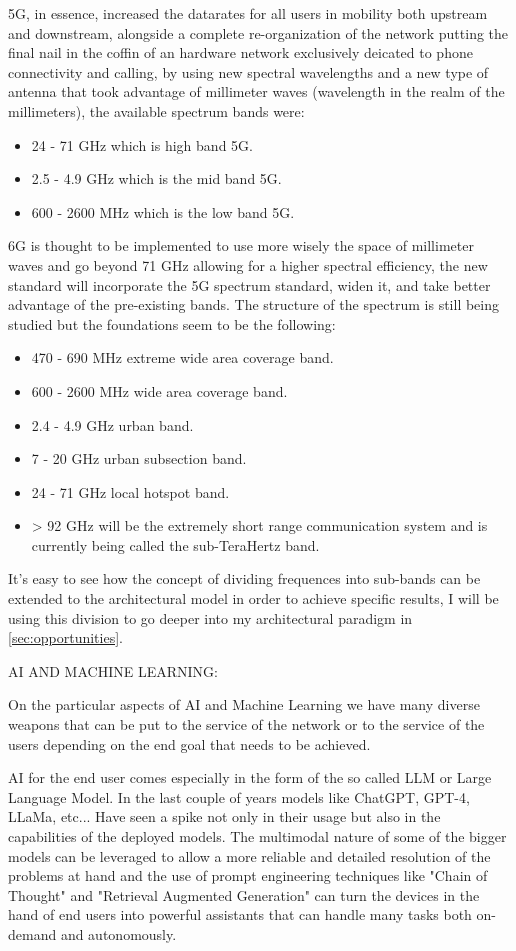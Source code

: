 5G, in essence, increased the datarates for all users in mobility both upstream and downstream,
alongside a complete re-organization of the network putting the final nail in the coffin of an
hardware network exclusively deicated to phone connectivity and calling, by using new spectral
wavelengths and a new type of antenna that took advantage of millimeter waves (wavelength in the
realm of the millimeters), the available spectrum bands were:
\begin{itemize}
	\item 24 - 71 GHz which is high band 5G.
	\item 2.5 - 4.9 GHz which is the mid band 5G.
	\item 600 - 2600 MHz which is the low band 5G.
\end{itemize}
6G is thought to be implemented to use more wisely the space of millimeter waves and go beyond 71
GHz allowing for a higher spectral efficiency, the new standard will incorporate the 5G spectrum
standard, widen it, and take better advantage of the pre-existing bands. The structure of the
spectrum is still being studied but the foundations seem to be the following:
\begin{itemize}
	\item 470 - 690 MHz extreme wide area coverage band.
	\item 600 - 2600 MHz wide area coverage band.
	\item 2.4 - 4.9 GHz urban band.
	\item 7 - 20 GHz urban subsection band.
	\item 24 - 71 GHz local hotspot band.
	\item > 92 GHz will be the extremely short range communication system and is currently being
	      called the sub-TeraHertz band.
\end{itemize}
It's easy to see how the concept of dividing frequences into sub-bands can be extended to the
architectural model in order to achieve specific results, I will be using this division to go
deeper into my architectural paradigm in \ref{sec:opportunities}.

\bigskip
\noindent
AI AND MACHINE LEARNING:
\label{ssec:ai-ml}

On the particular aspects of AI and Machine Learning we have many diverse weapons that can be put to
the service of the network or to the service of the users depending on the end goal that needs to
be achieved.

AI for the end user comes especially in the form of the so called LLM or Large Language Model. In
the last couple of years models like ChatGPT, GPT-4, LLaMa, etc... Have seen a spike not only in
their usage but also in the capabilities of the deployed models. The multimodal
nature of some of the bigger models can be leveraged to allow a more reliable and detailed
resolution of the problems at hand and the use of prompt engineering techniques like "Chain of
Thought" and "Retrieval Augmented Generation" can turn the devices in the hand of end users into
powerful assistants that can handle many tasks both on-demand and autonomously.

